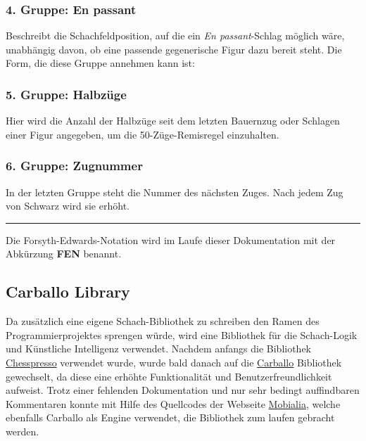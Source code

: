 \subsubsection{4. Gruppe: En passant}

\code{-}

Beschreibt die Schachfeldposition, auf die ein \emph{En passant}-Schlag möglich
wäre, unabhängig davon, ob eine passende gegenerische Figur dazu bereit steht.
Die Form, die diese Gruppe annehmen kann ist:\\ 

\subsubsection{5. Gruppe: Halbzüge}


Hier wird die Anzahl der Halbzüge seit dem letzten Bauernzug oder Schlagen einer
Figur angegeben, um die 50-Züge-Remisregel einzuhalten.

\subsubsection{6. Gruppe: Zugnummer}


In der letzten Gruppe steht die Nummer des nächsten Zuges. Nach jedem Zug von
Schwarz wird sie erhöht.

\rule{\textwidth}{0.5pt}

Die Forsyth-Edwards-Notation wird im Laufe dieser Dokumentation mit der
Abkürzung \textbf{FEN} benannt.

\subsection{Carballo Library}
\subsectionauthor{\oliver}

Da zusätzlich eine eigene Schach-Bibliothek zu schreiben den Ramen des
Programmierprojektes sprengen würde, wird eine Bibliothek für die Schach-Logik
und Künstliche Intelligenz verwendet. Nachdem anfangs die Bibliothek
\href{http://www.chesspresso.org/}{Chesspresso} verwendet wurde, wurde bald
danach auf die \href{https://github.com/albertoruibal/carballo}{Carballo}
Bibliothek gewechselt, da diese eine erhöhte Funktionalität und
Benutzerfreundlichkeit aufweist. Trotz einer fehlenden Dokumentation und nur
sehr bedingt auffindbaren Kommentaren konnte mit Hilfe des Quellcodes der
Webseite \href{https://www.mobialia.com/webchessgwt/}{Mobialia}, welche
ebenfalls Carballo als Engine verwendet, die Bibliothek zum laufen gebracht
werden.

